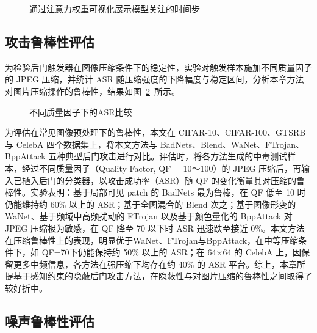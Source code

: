 \begin{figure}[htbp]
\centering
\caption{通过注意力权重可视化展示模型关注的时间步}
\label{fig:ch3-gradcam}
\end{figure}

\FloatBarrier
\subsection{攻击鲁棒性评估}\label{ux653bux51fbux9c81ux68d2ux6027ux8bc4ux4f30}

为检验后门触发器在图像压缩条件下的稳定性，实验对触发样本施加不同质量因子的 JPEG 压缩，并统计 ASR 随压缩强度的下降幅度与稳定区间，分析本章方法对图片压缩操作的鲁棒性，结果如图~\ref{fig:ch3-asr-jpeg}~所示。

\begin{figure}[htbp]
\centering
{}%
\caption{不同质量因子下的ASR比较}
\label{fig:ch3-asr-jpeg}
\end{figure}

为评估在常见图像预处理下的鲁棒性，本文在
CIFAR-10、CIFAR-100、GTSRB 与 CelebA 四个数据集上，将本文方法与
BadNets、Blend、WaNet、FTrojan、BppAttack
五种典型后门攻击进行对比。评估时，将各方法生成的中毒测试样本，经过不同质量因子（Quality Factor, QF = 10～100）的 JPEG 压缩后，再输入已植入后门的分类器，以攻击成功率（ASR）随 QF
的变化衡量其对压缩的鲁棒性。实验表明：基于局部可见 patch 的 BadNets
最为鲁棒，在 QF 低至 10 时仍能维持约 60\% 以上的 ASR；基于全图混合的
Blend 次之；基于图像形变的 WaNet、基于频域中高频扰动的 FTrojan
以及基于颜色量化的 BppAttack 对 JPEG 压缩极为敏感，在 QF 降至 70 以下时
ASR 迅速跌至接近
0\%。本文方法在压缩鲁棒性上的表现，明显优于WaNet、FTrojan与BppAttack，在中等压缩条件下，如
QF=70下仍能保持约 50\% 以上的 ASR；在 64×64 的 CelebA
上，因保留更多中频信息，各方法在强压缩下均存在约 40\% 的 ASR
平台。综上，本章所提基于感知约束的隐蔽后门攻击方法，在隐蔽性与对图片压缩的鲁棒性之间取得了较好折中。

\FloatBarrier
\subsection{噪声鲁棒性评估}\label{ux566aux97f3ux9c81ux682dux6027ux8bc4ux4f30}

